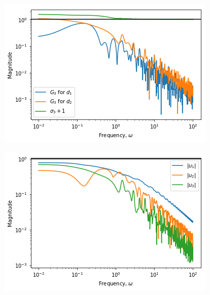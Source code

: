 \begin{figure}[H]
	\centering
	\begin{minipage}{.48\textwidth}
		\centering
		\includegraphics[width=\linewidth]{Figures/InputSaturation3_Updated}
		\label{fig:Input Saturation 3_Updated}
	\end{minipage}%
	\hfill
	\begin{minipage}{.48\textwidth}
		\centering
		\includegraphics[width=\linewidth]{Figures/Input_Requirements_Updated}
		\label{fig:Input Requirements_Updated}
	\end{minipage}
\end{figure}